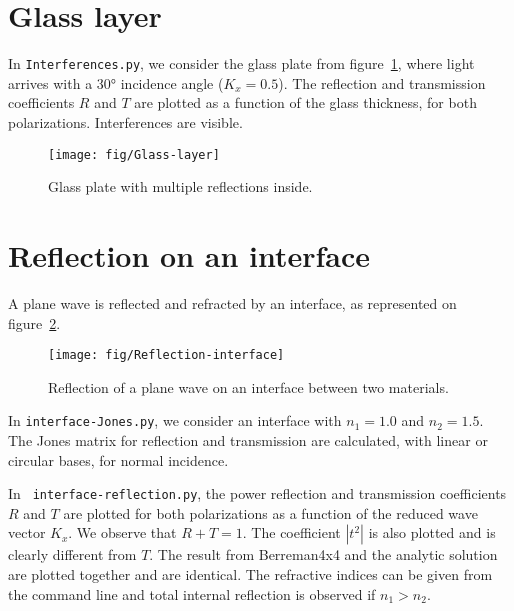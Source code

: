 

\section{Glass layer}

In \verb/Interferences.py/, we consider the glass plate from figure~\ref{fig:Glass-layer}, where light arrives with a 30° incidence angle ($K_x=0.5$).
The reflection and transmission coefficients $R$ and $T$ are plotted as a function of the glass thickness, for both polarizations.
Interferences are visible.

\begin{figure}[!h]
\texttt{[image: fig/Glass-layer]}
\caption{\label{fig:Glass-layer}Glass plate with multiple reflections inside.}
\end{figure}

\section{Reflection on an interface}
A plane wave is reflected and refracted by an interface, as represented on figure~\ref{fig:Reflection-interface}. 

\begin{figure}[!h]
\texttt{[image: fig/Reflection-interface]}
\caption{\label{fig:Reflection-interface}Reflection of a plane wave on an interface between two materials.}
\end{figure}

In \verb/interface-Jones.py/, we consider an interface with $n_1=1.0$ and $n_2=1.5$.
The Jones matrix for reflection and transmission are calculated, with linear or circular bases, for normal incidence.

In \verb/ interface-reflection.py/, the power reflection and transmission coefficients $R$ and $T$ are plotted for both polarizations as a function of the reduced wave vector $K_x$. 
We observe that $R+T=1$.
The coefficient $|t^2|$ is also plotted and is clearly different from $T$.
The result from Berreman4x4 and the analytic solution are plotted together and are identical.
The refractive indices can be given from the command line and total internal reflection is observed if $n_1>n_2$.


